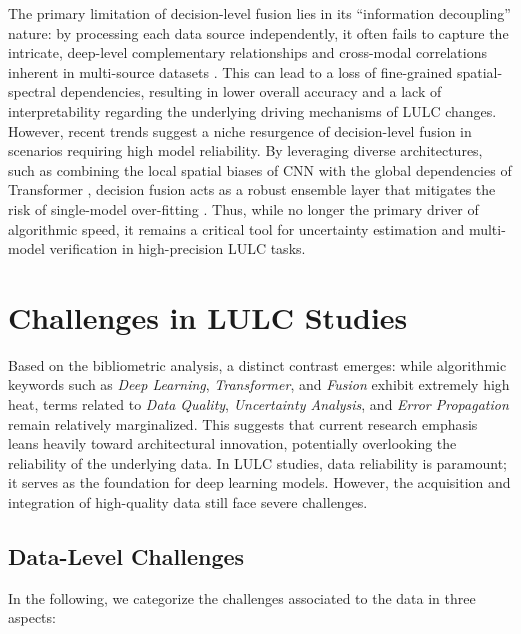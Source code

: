 \documentclass[]{interact}
\theoremstyle{plain}%
\theoremstyle{definition}
\theoremstyle{remark}
\begin{document}
The primary limitation of decision-level fusion lies in its ``information decoupling'' nature: by processing each data source independently, it often fails to capture the intricate, deep-level complementary relationships and cross-modal correlations inherent in multi-source datasets \citep{ORIG6}. This can lead to a loss of fine-grained spatial-spectral dependencies, resulting in lower overall accuracy and a lack of interpretability regarding the underlying driving mechanisms of LULC changes. However, recent trends suggest a niche resurgence of decision-level fusion in scenarios requiring high model reliability. By leveraging diverse architectures, such as combining the local spatial biases of CNN with the global dependencies of Transformer \citep{bazi2021vision}, decision fusion acts as a robust ensemble layer that mitigates the risk of single-model over-fitting \citep{belgiu2016random}. Thus, while no longer the primary driver of algorithmic speed, it remains a critical tool for uncertainty estimation and multi-model verification in high-precision LULC tasks.



\section{Challenges in LULC Studies}
Based on the bibliometric analysis, a distinct contrast emerges: while algorithmic keywords such as \textit{Deep Learning}, \textit{Transformer}, and \textit{Fusion} exhibit extremely high heat, terms related to \textit{Data Quality}, \textit{Uncertainty Analysis}, and \textit{Error Propagation} remain relatively marginalized. This suggests that current research emphasis leans heavily toward architectural innovation, potentially overlooking the reliability of the underlying data. In LULC studies, data reliability is paramount; it serves as the foundation for deep learning models. However, the acquisition and integration of high-quality data still face severe challenges.

\subsection{Data-Level Challenges}

In the following, we categorize the challenges associated to the data in three aspects:
\end{document}
